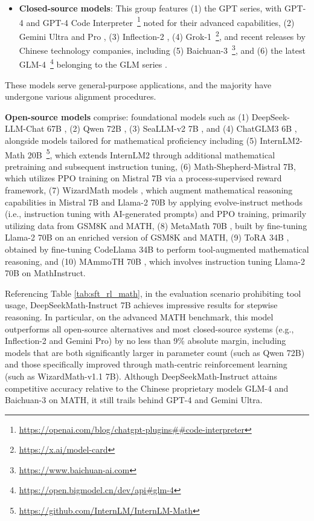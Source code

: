 \begin{itemize}[topsep=0pt]
    \item \textbf{Closed-source models}: This group features (1) the GPT series, with GPT-4 \citep{gpt4} and GPT-4 Code Interpreter~\footnote{\url{https://openai.com/blog/chatgpt-plugins\#\#code-interpreter}} noted for their advanced capabilities, (2) Gemini Ultra and Pro \citep{gemini}, (3) Inflection-2 \citep{inflection-2}, (4) Grok-1~\footnote{\url{https://x.ai/model-card}}, and recent releases by Chinese technology companies, including (5) Baichuan-3~\footnote{\url{https://www.baichuan-ai.com}}, and (6) the latest GLM-4~\footnote{\url{https://open.bigmodel.cn/dev/api\#glm-4}} belonging to the GLM series \citep{glm}.
\end{itemize}

These models serve general-purpose applications, and the majority have undergone various alignment procedures.

\item \textbf{Open-source models} comprise: foundational models such as (1) DeepSeek-LLM-Chat 67B \citep{deepseek-llm}, (2) Qwen 72B \citep{qwen}, (3) SeaLLM-v2 7B \citep{seallm}, and (4) ChatGLM3 6B \citep{chatglm3}, alongside models tailored for mathematical proficiency including (5) InternLM2-Math 20B~\footnote{\url{https://github.com/InternLM/InternLM-Math}}, which extends InternLM2 through additional mathematical pretraining and subsequent instruction tuning, (6) Math-Shepherd-Mistral 7B, which utilizes PPO training \citep{schulman2017proximal} on Mistral 7B \citep{mistral} via a process-supervised reward framework, (7) WizardMath models \citep{wizardmath}, which augment mathematical reasoning capabilities in Mistral 7B and Llama-2 70B \citep{llama2} by applying evolve-instruct methods (i.e., instruction tuning with AI-generated prompts) and PPO training, primarily utilizing data from GSM8K and MATH, (8) MetaMath 70B \citep{metamath}, built by fine-tuning Llama-2 70B on an enriched version of GSM8K and MATH, (9) ToRA 34B \cite{tora}, obtained by fine-tuning CodeLlama 34B to perform tool-augmented mathematical reasoning, and (10) MAmmoTH 70B \citep{MathInstruct}, which involves instruction tuning Llama-2 70B on MathInstruct.

Referencing Table \ref{tab:sft_rl_math}, in the evaluation scenario prohibiting tool usage, DeepSeekMath-Instruct 7B achieves impressive results for stepwise reasoning. In particular, on the advanced MATH benchmark, this model outperforms all open-source alternatives and most closed-source systems (e.g., Inflection-2 and Gemini Pro) by no less than 9\% absolute margin, including models that are both significantly larger in parameter count (such as Qwen 72B) and those specifically improved through math-centric reinforcement learning (such as WizardMath-v1.1 7B). Although DeepSeekMath-Instruct attains competitive accuracy relative to the Chinese proprietary models GLM-4 and Baichuan-3 on MATH, it still trails behind GPT-4 and Gemini Ultra.

